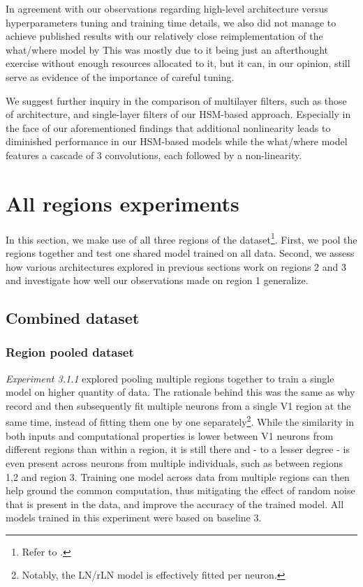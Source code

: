 In agreement with our observations regarding high-level architecture versus hyperparameters tuning and training time details, we also did not manage to achieve published results with our relatively close reimplementation of the what/where model by \citeauthor{klindt} This was mostly due to it being just an afterthought exercise without enough resources allocated to it, but it can, in our opinion, still serve as evidence of the importance of careful tuning. 

We suggest further inquiry in the comparison of multilayer filters, such as those of \citeauthor{klindt} architecture, and single-layer filters of our HSM-based approach. Especially in the face of our aforementioned findings that additional nonlinearity leads to diminished performance in our HSM-based models while the what/where model features a cascade of 3 convolutions, each followed by a non-linearity. 

\section{All regions experiments}

In this section, we make use of all three regions of the dataset\footnote{Refer to .}. First, we pool the regions together and test one shared model trained on all data. Second, we assess how various architectures explored in previous sections work on regions 2 and 3 and investigate how well our observations made on region 1 generalize.

\subsection{Combined dataset}\label{ch:5.3.1}
\subsubsection{Region pooled dataset}

\textit{Experiment 3.1.1} explored pooling multiple regions together to train a single model on higher quantity of data. The rationale behind this was the same as why record and then subsequently fit multiple neurons from a single V1 region at the same time, instead of fitting them one by one separately\footnote{Notably, the LN/rLN model is effectively fitted per neuron.}. While the similarity in both inputs and computational properties is lower between V1 neurons from different regions than within a region, it is still there and - to a lesser degree - is even present across neurons from multiple individuals, such as between regions 1,2 and region 3. Training one model across data from multiple regions can then help ground the common computation, thus mitigating the effect of random noise that is present in the data, and improve the accuracy of the trained model. All models trained in this experiment were based on baseline 3. 

